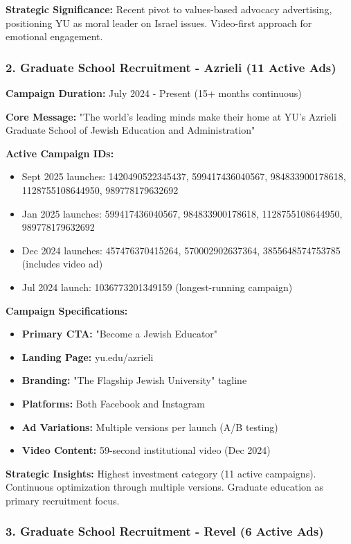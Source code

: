\documentclass[12pt,letterpaper]{article}
\begin{document}
\textbf{Strategic Significance:} Recent pivot to values-based advocacy advertising, positioning YU as moral leader on Israel issues. Video-first approach for emotional engagement.

\subsubsection{2. Graduate School Recruitment - Azrieli (11 Active Ads)}

\textbf{Campaign Duration:} July 2024 - Present (15+ months continuous)

\textbf{Core Message:} "The world's leading minds make their home at YU's Azrieli Graduate School of Jewish Education and Administration"

\textbf{Active Campaign IDs:}
\begin{itemize}[leftmargin=*]
    \item Sept 2025 launches: 1420490522345437, 599417436040567, 984833900178618, 1128755108644950, 989778179632692
    \item Jan 2025 launches: 599417436040567, 984833900178618, 1128755108644950, 989778179632692
    \item Dec 2024 launches: 457476370415264, 570002902637364, 3855648574753785 (includes video ad)
    \item Jul 2024 launch: 1036773201349159 (longest-running campaign)
\end{itemize}

\textbf{Campaign Specifications:}
\begin{itemize}[leftmargin=*]
    \item \textbf{Primary CTA:} "Become a Jewish Educator"
    \item \textbf{Landing Page:} yu.edu/azrieli
    \item \textbf{Branding:} "The Flagship Jewish University" tagline
    \item \textbf{Platforms:} Both Facebook and Instagram
    \item \textbf{Ad Variations:} Multiple versions per launch (A/B testing)
    \item \textbf{Video Content:} 59-second institutional video (Dec 2024)
\end{itemize}

\textbf{Strategic Insights:} Highest investment category (11 active campaigns). Continuous optimization through multiple versions. Graduate education as primary recruitment focus.

\subsubsection{3. Graduate School Recruitment - Revel (6 Active Ads)}
\end{document}

